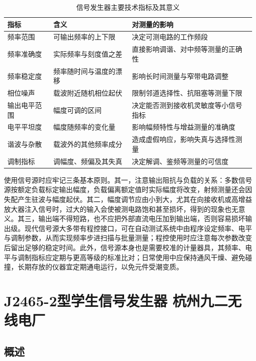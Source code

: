 \documentclass[12pt,UTF8]{ctexbook}
\begin{document}
\begin{table}[H]
	\centering
	\caption{信号发生器主要技术指标及其意义}
	\begin{tabular}{|p{2.6cm}|p{4.6cm}|p{5.4cm}|}
		\hline
		\textbf{指标} & \textbf{含义} & \textbf{对测量的影响} \\ \hline
		频率范围 & 可输出频率的上下限 & 决定可测电路的工作频段 \\ \hline
		频率准确度 & 实际频率与刻度值之差 & 直接影响调谐、对中频等测量的正确性 \\ \hline
		频率稳定度 & 频率随时间与温度的漂移 & 影响长时间测量与窄带电路调整 \\ \hline
		相位噪声 & 载波附近随机相位起伏 & 限制邻道选择性、抗阻塞等测量下限 \\ \hline
		输出电平范围 & 幅度可调的区间 & 决定能否测到接收机灵敏度等小信号指标 \\ \hline
		电平平坦度 & 幅度随频率的变化量 & 影响幅频特性与增益测量的准确度 \\ \hline
		谐波与杂散 & 载波外的其他频率成分 & 造成虚假响应，影响失真与选择性测量 \\ \hline
		调制指标 & 调幅度、频偏及其失真 & 决定解调、鉴频等测量的可信度 \\ \hline
	\end{tabular}
\end{table}

使用信号源时应牢记三条基本原则。其一，注意输出阻抗与负载的关系：多数信号源按额定负载标定输出幅度，负载偏离额定值时实际幅度将改变，射频测量还会因失配产生驻波与幅度起伏。其二，幅度调节应由小到大，尤其在向接收机或高增益放大器注入信号时，过大的输入会使被测电路饱和甚至损坏，得到的现象也无意义。其三，输出端不得短路，也不应把外部直流电压加到输出端，否则容易损坏输出级。现代信号源大多带有程控接口，可在自动测试系统中由程序设定频率、电平与调制参数，从而实现频率步进扫描与批量测量；程控使用时应注意每次参数改变后留出足够的稳定时间。此外，信号源本身也是需要校准的计量器具，其频率、电平与调制指标应定期与更高等级的标准比对；日常使用中应保持通风干燥、避免碰撞，长期存放的仪器宜定期通电运行，以免元件受潮变质。

\mainmatter

\chapter{J2465-2型学生信号发生器 杭州九二无线电厂}
	
\section{概述}
\end{document}
